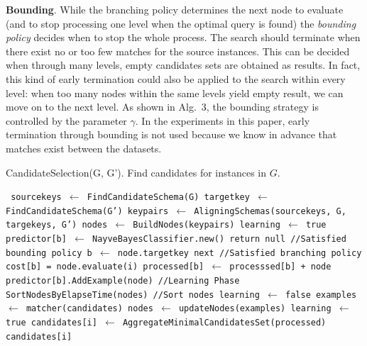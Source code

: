 \textbf{Bounding}. While the branching policy determines the next node to evaluate (and to stop processing one level when the optimal query is found)  the \emph{bounding policy} decides when to stop the whole process. The search should terminate when there exist no or too few matches for the source instances. This can be decided when through many levels, empty candidates sets are obtained as results. In fact, this kind of early termination could also be applied to the search within every level: when too many nodes within the same levels yield empty result, we can move on to the next level. As shown in Alg.~3, the bounding strategy is 
controlled by the parameter $\gamma$. In the experiments in this paper, early termination through bounding is not used because we know in advance that matches exist between the datasets. 
\begin{algorithm}
\caption{CandidateSelection(G, G'). Find candidates for instances in $G$.}
\begin{algorithmic}
\scriptsize\tt
\STATE  sourcekeys  $\leftarrow$ FindCandidateSchema(G)
\STATE  targetkey  $\leftarrow$ FindCandidateSchema(G')
\STATE  keypairs  $\leftarrow$ AligningSchemas(sourcekeys, G, targekeys, G') 
\STATE  nodes  $\leftarrow$ BuildNodes(keypairs) 
\STATE  learning  $\leftarrow$ true
\STATE predictor[b] $\leftarrow$ NayveBayesClassifier.new()
\ENDFOR 
{} %
\STATE  return null //Satisfied bounding policy
\ENDIF
{}  
\STATE  b $\leftarrow$ node.targetkey
\STATE next //Satisfied branching policy 
\ENDIF
{}  
\STATE  cost[b] = node.evaluate(i) 
\STATE  processed[b] $\leftarrow$  processsed[b] + node 
\STATE    predictor[b].AddExample(node) //Learning Phase
\ENDIF 
\ENDIF 
\ENDFOR
{} 
\STATE    SortNodesByElapseTime(nodes)  //Sort nodes 
\ENDIF
{} 
\STATE    learning $\leftarrow$ false
\ENDIF
{} 
\STATE  examples  $\leftarrow$ matcher(candidates)
\STATE  nodes  $\leftarrow$ updateNodes(examples) 
\STATE    learning $\leftarrow$ true
\ENDIF
\STATE  candidates[i] $\leftarrow$ AggregateMinimalCandidatesSet(processed)
\ENDFOR 
\RETURN candidates[i]
\end{algorithmic}
\end{algorithm}

